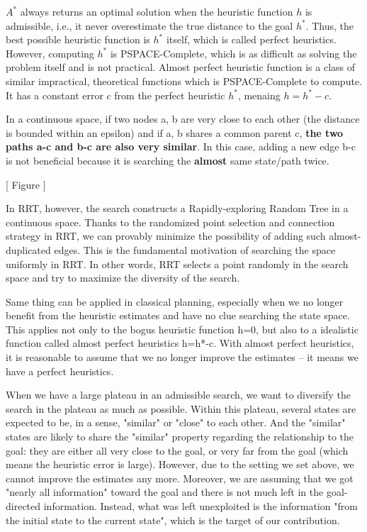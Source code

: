 
$A^*$ always returns an optimal solution when the heuristic function $h$ is
admissible, i.e., it never overestimate the true distance to the goal
$h^*$. Thus, the best possible heuristic function is $h^*$ itself, which is
called perfect heuristics. However, computing $h^*$ is PSPACE-Complete,
which is as difficult as solving the problem itself and is not
practical. Almost perfect heuristic function is a class of similar
impractical, theoretical functions which is PSPACE-Complete to compute.
It has a constant error $c$ from the perfect heuristic $h^*$, menaing $h=h^*-c$.


In a continuous space,
if two nodes a, b are very close to each other (the distance is bounded within an epsilon)
and if a, b shares a common parent c,
\textbf{the two paths a-c and b-c are also very similar}.
In this case, adding a new edge b-c is
not beneficial because it is searching the \textbf{almost} same state/path twice.

[ Figure ]

In RRT, however, the search constructs a Rapidly-exploring Random Tree in a continuous space.
Thanks to the randomized point selection and connection strategy in RRT,
we can provably minimize the possibility of adding such almost-duplicated edges.
This is the fundamental motivation of searching the space uniformly in RRT.
In other words, RRT selects a point randomly in the search space and
try to maximize the diversity of the search.



Same thing can be applied in classical planning, especially when we no
longer benefit from the heuristic estimates and have no clue searching the
state space.
This applies not only to the bogus heuristic function h=0, but also to a idealistic
function called almost perfect heuristics h=h*-c. With almost perfect
heuristics, it is reasonable to assume that we no longer improve the
estimates -- it means we have a perfect heuristics.

When we have a large plateau in an admissible search,
we want to diversify the search in the plateau as much as possible.
Within this plateau, several states are expected to be, in a sense,
"similar" or "close" to each other. And the "similar" states are likely to
share the "similar" property regarding the relationship to the goal:
they are either all very close to the goal, or very far from the goal (which means
the heuristic error is large). However, due to the setting we set
above, we cannot improve the estimates any more. Moreover, we are assuming
that we got "nearly all information" toward the goal and there is not much
left in the goal-directed information.
Instead, what was left unexploited is the information "from the initial state to the
current state", which is the target of our contribution.


